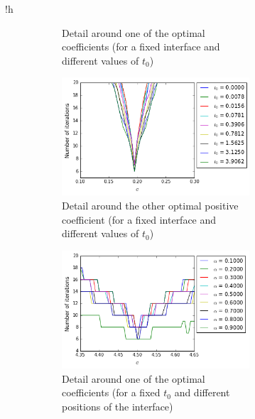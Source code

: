 \begin{figure}{!h}
\begin{subfigure}[t]{.5\linewidth}
\begin{subfigure}[t]{.5\linewidth}
\begin{center}
	\caption{Detail around one of the optimal coefficients (for a fixed interface and different values of $t_0$) \label{fig:optimVarT0PDetail} }
\end{center}
\end{subfigure}
\begin{subfigure}[t]{.5\linewidth}
\begin{center}
	\includegraphics[scale=.375]{Fig3d.png}
	\caption{Detail around the other optimal positive coefficient (for a fixed interface and different values of $t_0$) \label{fig:optimVarT0PDetail2}}
\end{center}
\end{subfigure}
\begin{subfigure}[t]{.5\linewidth}
\begin{center}
	\includegraphics[scale=.375]{Fig3e.png}
	\caption{Detail around one of the optimal coefficients (for a fixed $t_0$ and different positions of the interface) \label{fig:optimVarInterfacePDetail}  }
\end{center}
\end{subfigure}
\begin{subfigure}[t]{.5\linewidth}
\begin{center}

\end{center}
\end{subfigure}
\end{subfigure}
\end{figure}
